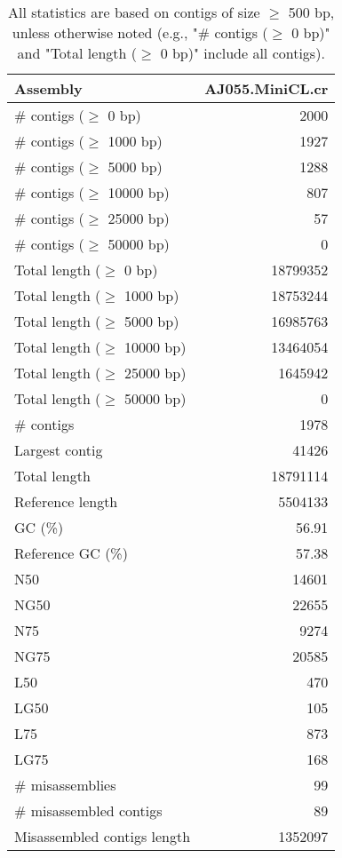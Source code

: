 \documentclass[12pt,a4paper]{article}
\begin{document}
\begin{table}[ht]
\begin{center}
\caption{All statistics are based on contigs of size $\geq$ 500 bp, unless otherwise noted (e.g., "\# contigs ($\geq$ 0 bp)" and "Total length ($\geq$ 0 bp)" include all contigs).}
\begin{tabular}{|l*{1}{|r}|}
\hline
Assembly & AJ055.MiniCL.cr \\ \hline
\# contigs ($\geq$ 0 bp) & 2000 \\ \hline
\# contigs ($\geq$ 1000 bp) & 1927 \\ \hline
\# contigs ($\geq$ 5000 bp) & 1288 \\ \hline
\# contigs ($\geq$ 10000 bp) & 807 \\ \hline
\# contigs ($\geq$ 25000 bp) & 57 \\ \hline
\# contigs ($\geq$ 50000 bp) & 0 \\ \hline
Total length ($\geq$ 0 bp) & 18799352 \\ \hline
Total length ($\geq$ 1000 bp) & 18753244 \\ \hline
Total length ($\geq$ 5000 bp) & 16985763 \\ \hline
Total length ($\geq$ 10000 bp) & 13464054 \\ \hline
Total length ($\geq$ 25000 bp) & 1645942 \\ \hline
Total length ($\geq$ 50000 bp) & 0 \\ \hline
\# contigs & 1978 \\ \hline
Largest contig & 41426 \\ \hline
Total length & 18791114 \\ \hline
Reference length & 5504133 \\ \hline
GC (\%) & 56.91 \\ \hline
Reference GC (\%) & 57.38 \\ \hline
N50 & 14601 \\ \hline
NG50 & 22655 \\ \hline
N75 & 9274 \\ \hline
NG75 & 20585 \\ \hline
L50 & 470 \\ \hline
LG50 & 105 \\ \hline
L75 & 873 \\ \hline
LG75 & 168 \\ \hline
\# misassemblies & 99 \\ \hline
\# misassembled contigs & 89 \\ \hline
Misassembled contigs length & 1352097 \\ \hline

\end{tabular}
\end{center}
\end{table}
\end{document}
